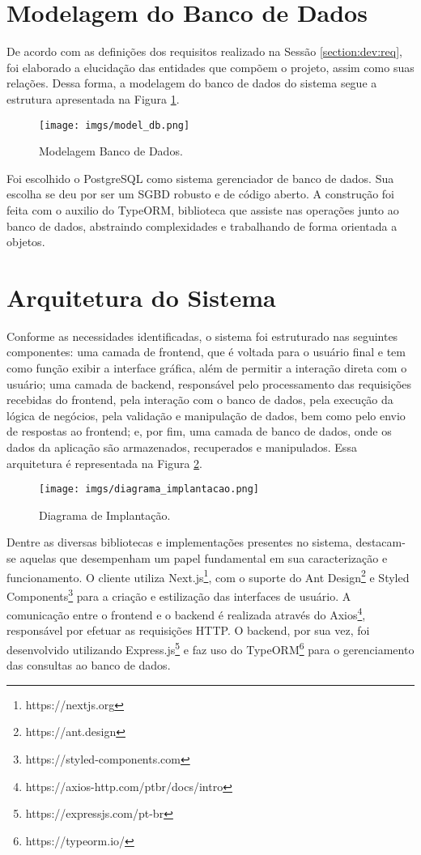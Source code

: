 \section{Modelagem do Banco de Dados}\label{section:dev:model}

De acordo com as definições dos requisitos realizado na Sessão \ref{section:dev:req}, foi elaborado a elucidação das entidades que compõem o projeto, assim como suas relações. Dessa forma, a modelagem do banco de dados do sistema segue a estrutura apresentada na Figura \ref{fig:Figura2}.

\begin{figure}[h]
    \centering
    \texttt{[image: imgs/model\_db.png]}
    \caption{Modelagem Banco de Dados.}
    \label{fig:Figura2}
\end{figure}

Foi escolhido o PostgreSQL como sistema gerenciador de banco de dados. Sua escolha se deu por ser um SGBD robusto e de código aberto. A construção foi feita com o auxilio do TypeORM, biblioteca que assiste nas operações junto ao banco de dados, abstraindo complexidades e trabalhando de forma orientada a objetos.


\section{Arquitetura do Sistema}

Conforme as necessidades identificadas, o sistema foi estruturado nas seguintes componentes: uma camada de frontend, que é voltada para o usuário final e tem como função exibir a interface gráfica, além de permitir a interação direta com o usuário; uma camada de backend, responsável pelo processamento das requisições recebidas do frontend, pela interação com o banco de dados, pela execução da lógica de negócios, pela validação e manipulação de dados, bem como pelo envio de respostas ao frontend; e, por fim, uma camada de banco de dados, onde os dados da aplicação são armazenados, recuperados e manipulados. Essa arquitetura é representada na Figura \ref{fig:DigImpl}.

\begin{figure}[h]
    \centering
    \texttt{[image: imgs/diagrama\_implantacao.png]}
    \caption{Diagrama de Implantação.}
    \label{fig:DigImpl}
\end{figure}



Dentre as diversas bibliotecas e implementações presentes no sistema, destacam-se aquelas que desempenham um papel fundamental em sua caracterização e funcionamento. O cliente utiliza Next.js\footnote{https://nextjs.org}, com o suporte do Ant Design\footnote{https://ant.design}  e Styled Components\footnote{https://styled-components.com} para a criação e estilização das interfaces de usuário. A comunicação entre o frontend e o backend é realizada através do Axios\footnote{https://axios-http.com/ptbr/docs/intro}, responsável por efetuar as requisições HTTP. O backend, por sua vez, foi desenvolvido utilizando Express.js\footnote{https://expressjs.com/pt-br} e faz uso do TypeORM\footnote{https://typeorm.io/} para o gerenciamento das consultas ao banco de dados.


